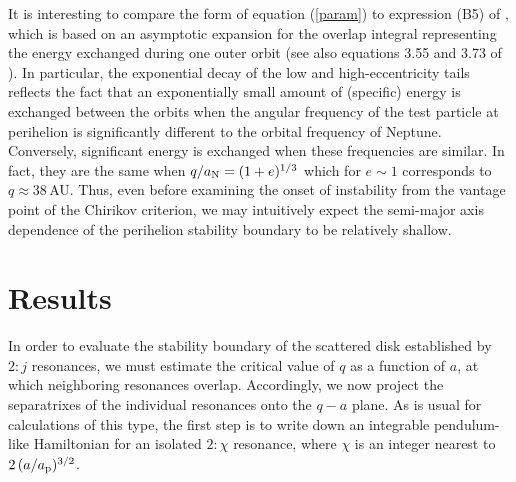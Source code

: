 \documentclass[twocolumn]{aastex62}
\newcommand{\an}{a_{\rm{N}}}
\begin{document}
It is interesting to compare the form of equation (\ref{param}) to expression (B5) of \citet{2013MNRAS.435.2187M}, which is based on an asymptotic expansion for the overlap integral representing the energy exchanged during one outer orbit (see also equations 3.55 and 3.73 of \citealt{Mardling2008Chaos}). In particular, the exponential decay of the low and high-eccentricity tails reflects the fact that an exponentially small amount of (specific) energy is exchanged between the orbits when the angular frequency of the test particle at perihelion is significantly different to the orbital frequency of Neptune. Conversely, significant energy is exchanged when these frequencies are similar. In fact, they are the same when $q/\an= (1+e)^{1/3}$ which for $e\sim 1$ corresponds to $q\approx38\,$AU. Thus, even before examining the onset of instability from the vantage point of the Chirikov criterion, we may intuitively expect the semi-major axis dependence of the perihelion stability boundary to be relatively shallow. %

\section{Results} \label{sec:results}
In order to evaluate the stability boundary of the scattered disk established by $2:j$ resonances, we must estimate the critical value of $q$ as a function of $a$, at which neighboring resonances overlap. Accordingly, we now project the separatrixes of the individual resonances onto the $q-a$ plane. As is usual for calculations of this type, the first step is to write down an integrable pendulum-like Hamiltonian for an isolated $2:\chi$ resonance, where $\chi$ is an integer nearest to $2\,(a/a_{\rm{p}})^{3/2}$. 
\end{document}
